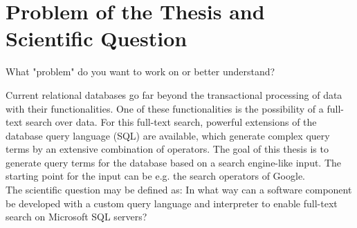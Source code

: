 \section{Problem of the Thesis and Scientific Question}
What "problem" do you want to work on or better understand?

Current relational databases go far beyond the transactional processing of data with their functionalities. One of these functionalities is the possibility of a full-text search over data. For this full-text search, powerful extensions of the database query language (SQL) are available, which generate complex query terms by an extensive combination of operators. The goal of this thesis is to generate query terms for the database based on a search engine-like input. The starting point for the input can be e.g. the search operators of Google.\\
The scientific question may be defined as: In what way can a software component be developed with a custom query language and interpreter to enable full-text search on Microsoft SQL servers?